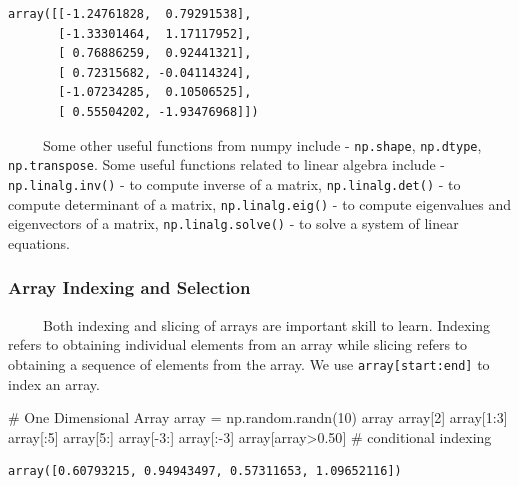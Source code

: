 \documentclass[
  letterpaper,
  DIV=11,
  numbers=noendperiod]{scrreprt}
\newenvironment{Shaded}{\begin{snugshade}}{\end{snugshade}}
\newcommand{\CommentTok}[1]{\textcolor[rgb]{0.37,0.37,0.37}{#1}}
\newcommand{\DecValTok}[1]{\textcolor[rgb]{0.68,0.00,0.00}{#1}}
\newcommand{\FloatTok}[1]{\textcolor[rgb]{0.68,0.00,0.00}{#1}}
\newcommand{\NormalTok}[1]{\textcolor[rgb]{0.00,0.23,0.31}{#1}}
\newcommand{\OperatorTok}[1]{\textcolor[rgb]{0.37,0.37,0.37}{#1}}
\begin{document}
\begin{verbatim}
array([[-1.24761828,  0.79291538],
       [-1.33301464,  1.17117952],
       [ 0.76886259,  0.92441321],
       [ 0.72315682, -0.04114324],
       [-1.07234285,  0.10506525],
       [ 0.55504202, -1.93476968]])
\end{verbatim}

~~~~~Some other useful functions from numpy include - \texttt{np.shape},
\texttt{np.dtype}, \texttt{np.transpose}. Some useful functions related
to linear algebra include - \texttt{np.linalg.inv()} - to compute
inverse of a matrix, \texttt{np.linalg.det()} - to compute determinant
of a matrix, \texttt{np.linalg.eig()} - to compute eigenvalues and
eigenvectors of a matrix, \texttt{np.linalg.solve()} - to solve a system
of linear equations.

\subsubsection{Array Indexing and
Selection}\label{array-indexing-and-selection}

~~~~~Both indexing and slicing of arrays are important skill to learn.
Indexing refers to obtaining individual elements from an array while
slicing refers to obtaining a sequence of elements from the array. We
use \texttt{array{[}start:end{]}} to index an array.

\begin{Shaded}
\begin{Highlighting}[]
\CommentTok{\# One Dimensional Array}
\NormalTok{array }\OperatorTok{=}\NormalTok{ np.random.randn(}\DecValTok{10}\NormalTok{)}
\NormalTok{array}
\NormalTok{array[}\DecValTok{2}\NormalTok{]}
\NormalTok{array[}\DecValTok{1}\NormalTok{:}\DecValTok{3}\NormalTok{]}
\NormalTok{array[:}\DecValTok{5}\NormalTok{]}
\NormalTok{array[}\DecValTok{5}\NormalTok{:]}
\NormalTok{array[}\OperatorTok{{-}}\DecValTok{3}\NormalTok{:]}
\NormalTok{array[:}\OperatorTok{{-}}\DecValTok{3}\NormalTok{]}
\NormalTok{array[array}\OperatorTok{\textgreater{}}\FloatTok{0.50}\NormalTok{] }\CommentTok{\# conditional indexing }
\end{Highlighting}
\end{Shaded}

\begin{verbatim}
array([0.60793215, 0.94943497, 0.57311653, 1.09652116])
\end{verbatim}
\end{document}
